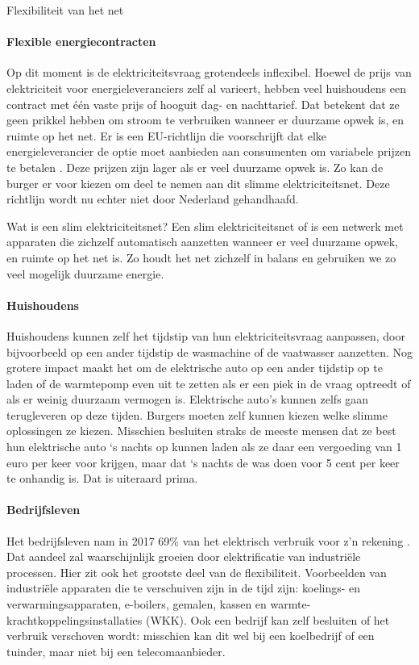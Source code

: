 \begin{voorstel}{Flexibiliteit van het net}
\begin{multicols}{2}
\begin{overwegingen}
\paragraph{Flexible energiecontracten}
Op dit moment is de elektriciteitsvraag grotendeels inflexibel. Hoewel de prijs van elektriciteit voor energieleveranciers zelf al varieert, hebben veel huishoudens een contract met één vaste prijs of hooguit dag- en nachttarief. Dat betekent dat ze geen prikkel hebben om stroom te verbruiken wanneer er duurzame opwek is, en ruimte op het net. Er is een EU-richtlijn die voorschrijft dat elke energieleverancier de optie moet aanbieden aan consumenten om variabele prijzen te betalen \parencite{europees_parlement_notitle_nodate}. Deze prijzen zijn lager als er veel duurzame opwek is. Zo kan de burger er voor kiezen om deel te nemen aan dit slimme elektriciteitsnet. Deze richtlijn wordt nu echter niet door Nederland gehandhaafd.

\begin{infobox}{Wat is een slim elektriciteitsnet?}
Een slim elektriciteitsnet of  is een netwerk met apparaten die zichzelf automatisch aanzetten wanneer er veel duurzame opwek, en ruimte op het net is. Zo houdt het net zichzelf in balans en gebruiken we zo veel mogelijk duurzame energie.
\end{infobox}

\paragraph{Huishoudens}
Huishoudens kunnen zelf het tijdstip van hun elektriciteitsvraag aanpassen, door bijvoorbeeld op een ander tijdstip de wasmachine of de vaatwasser aanzetten. Nog grotere impact maakt het om de elektrische auto op een ander tijdstip op te laden of de warmtepomp even uit te zetten als er een piek in de vraag optreedt of als er weinig duurzaam vermogen is. Elektrische auto’s kunnen zelfs gaan terugleveren op deze tijden. Burgers moeten zelf kunnen kiezen welke slimme oplossingen ze kiezen. Misschien besluiten straks de meeste mensen dat ze best hun elektrische auto ‘s nachts op kunnen laden als ze daar een vergoeding van 1 euro per keer voor krijgen, maar dat ‘s nachts de was doen voor 5 cent per keer te onhandig is. Dat is uiteraard prima.

\paragraph{Bedrijfsleven}
Het bedrijfsleven nam in 2017 69\% van het elektrisch verbruik voor z’n rekening \parencite{centraal_bureau_voor_de_statistiek_statline_nodate}. Dat aandeel zal waarschijnlijk groeien door elektrificatie van industriële processen. Hier zit ook het grootste deel van de flexibiliteit. Voorbeelden van industriële apparaten die te verschuiven zijn in de tijd zijn: koelings- en verwarmingsapparaten, e-boilers, gemalen, kassen en warmte-krachtkoppelingsinstallaties (WKK). Ook een bedrijf kan zelf besluiten of het verbruik verschoven wordt: misschien kan dit wel bij een koelbedrijf of een tuinder, maar niet bij een telecomaanbieder.


\end{overwegingen}
\end{multicols}
\end{voorstel}
